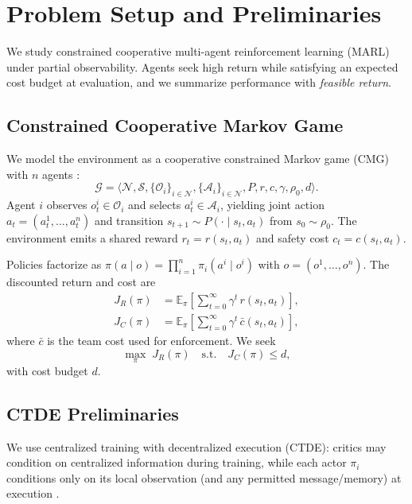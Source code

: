\documentclass{article}
\theoremstyle{plain}
\theoremstyle{definition}
\theoremstyle{remark}
\begin{document}

\section{Problem Setup and Preliminaries}
\label{sec:setup}

We study constrained cooperative multi-agent reinforcement learning (MARL) under partial observability. Agents seek high return while satisfying an expected cost budget at evaluation, and we summarize performance with \emph{feasible return}.

\subsection{Constrained Cooperative Markov Game}
We model the environment as a cooperative constrained Markov game (CMG) with $n$ agents \cite{littman1994markovgames}:
\[
\mathcal{G} =
\langle
\mathcal{N}, \mathcal{S}, \{\mathcal{O}_i\}_{i\in\mathcal{N}},
\{\mathcal{A}_i\}_{i\in\mathcal{N}}, P, r, c, \gamma, \rho_0, d
\rangle .
\]
Agent $i$ observes $o_t^i\in\mathcal{O}_i$ and selects $a_t^i\in\mathcal{A}_i$, yielding joint action $a_t=(a_t^1,\dots,a_t^n)$ and transition $s_{t+1}\sim P(\cdot\mid s_t,a_t)$ from $s_0\sim\rho_0$.
The environment emits a shared reward $r_t=r(s_t,a_t)$ and safety cost $c_t=c(s_t,a_t)$.

Policies factorize as $\pi(a\mid o)=\prod_{i=1}^n \pi_i(a^i\mid o^i)$ with $o=(o^1,\dots,o^n)$.
The discounted return and cost are
\begin{align}
J_R(\pi) &= \mathbb{E}_{\pi}\!\left[\sum_{t=0}^{\infty}\gamma^t\, r(s_t,a_t)\right], \label{eq:JR}\\
J_C(\pi) &= \mathbb{E}_{\pi}\!\left[\sum_{t=0}^{\infty}\gamma^t\, \bar{c}(s_t,a_t)\right], \label{eq:JC}
\end{align}
where $\bar{c}$ is the team cost used for enforcement.
We seek
\begin{equation}
\max_{\pi}\; J_R(\pi)\quad \text{s.t.}\quad J_C(\pi)\le d,
\label{eq:cmdg}
\end{equation}
with cost budget $d$.

\subsection{CTDE Preliminaries}
\label{sec:ctde}
We use centralized training with decentralized execution (CTDE): critics may condition on centralized information during training, while each actor $\pi_i$ conditions only on its local observation (and any permitted message/memory) at execution \cite{lowe2020multiagentactorcriticmixedcooperativecompetitive, yu2022surprisingeffectivenessppocooperative}.
\end{document}
